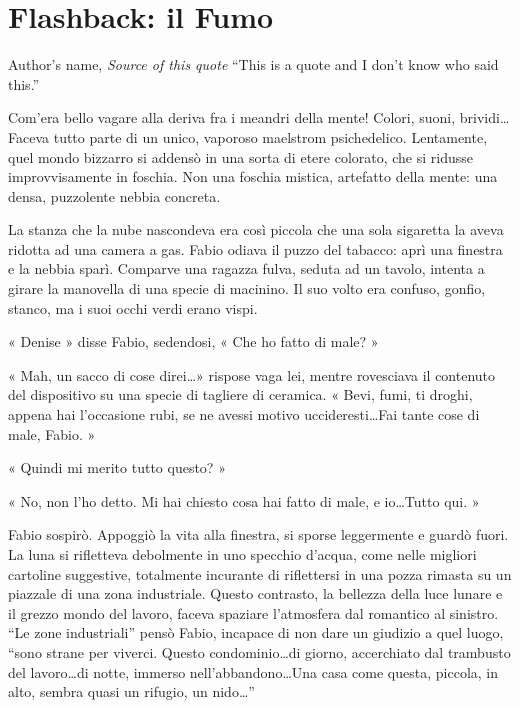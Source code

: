 \chapter{Flashback: il Fumo}

\begin{chapquote}{Author's name, \textit{Source of this quote}}
``This is a quote and I don't know who said this.''
\end{chapquote}


Com'era bello vagare alla deriva fra i meandri della mente! Colori, suoni, brividi\ldots Faceva tutto parte di un unico, vaporoso maelstrom psichedelico. Lentamente, quel mondo bizzarro si addensò in una sorta di etere colorato, che si ridusse improvvisamente in foschia. Non una foschia mistica, artefatto della mente: una densa, puzzolente nebbia concreta.

La stanza che la nube nascondeva era così piccola che una sola sigaretta la aveva ridotta ad una camera a gas. Fabio odiava il puzzo del tabacco: aprì una finestra e la nebbia sparì. Comparve una ragazza fulva, seduta ad un tavolo, intenta a girare la manovella di una specie di macinino. Il suo volto era confuso, gonfio, stanco, ma i suoi occhi verdi erano vispi.

« Denise » disse Fabio, sedendosi, « Che ho fatto di male? »

« Mah, un sacco di cose direi\ldots » rispose vaga lei, mentre rovesciava il contenuto del dispositivo su una specie di tagliere di ceramica. « Bevi, fumi, ti droghi, appena hai l'occasione rubi, se ne avessi motivo uccideresti\ldots Fai tante cose di male, Fabio. »

« Quindi mi merito tutto questo? »

« No, non l'ho detto. Mi hai chiesto cosa hai fatto di male, e io\ldots Tutto qui. »

Fabio sospirò. Appoggiò la vita alla finestra, si sporse leggermente e guardò fuori. La luna si rifletteva debolmente in uno specchio d'acqua, come nelle migliori cartoline suggestive, totalmente incurante di riflettersi in una pozza rimasta su un piazzale di una zona industriale. Questo contrasto, la bellezza della luce lunare e il grezzo mondo del lavoro, faceva spaziare l'atmosfera dal romantico al sinistro. ``Le zone industriali'' pensò Fabio, incapace di non dare un giudizio a quel luogo, ``sono strane per viverci. Questo condominio\ldots di giorno, accerchiato dal trambusto del lavoro\ldots di notte, immerso nell'abbandono\ldots Una casa come questa, piccola, in alto, sembra quasi un rifugio, un nido\ldots''

